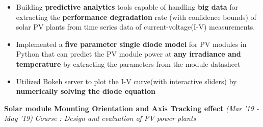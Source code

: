 \documentclass[10 pt]{article}%
\begin{document}
{{{\begin{itemize}[leftmargin=*]
		\item Building \textbf{predictive analytics} tools capable of handling \textbf{big data} for extracting the \textbf{performance degradation} rate (with confidence bounds) of solar PV plants from time series data of current-voltage(I-V) measurements.
		\item  Implemented a \textbf{five parameter single diode model} for PV modules in Python that can predict the PV module power at \textbf{any irradiance and temperature} by extracting the parameters from the module datasheet
	\item Utilized Bokeh server to plot the I-V curve(with interactive sliders) by \textbf{numerically solving the diode equation}
\end{itemize}
{\flushleft \textbf {\large{Solar module Mounting Orientation and Axis Tracking effect}} \hfill {{{\em{(Mar '19 - May '19)}}}}
\vspace{-0.8em}
{\flushleft \em{Course : Design and evaluation of PV power plants}}
}}}}
\end{document}
